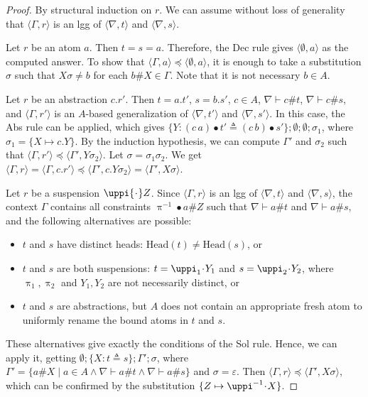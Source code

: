 \documentclass[11pt,a4paper]{amsart}
\theoremstyle{definition}
\newcommand{\head}{\mathrm{Head}}
\newcommand{\permap}{{\mkern 1mu\cdot \mkern 1mu}}
\newcommand{\permef}{\bullet}
\newcommand\ppi{\uppi}
\newcommand{\np}[2]{\langle #1, \allowbreak #2\rangle}
\newcommand{\Atoms}{A}
\begin{document}
\begin{proof}
 By structural induction on $r$. We can assume without loss of generality that $\np{\Gamma}{r}$ is an lgg of $\np{\nabla}{t}$ and $\np{\nabla}{s}$.

Let $r$ be an atom $a$. Then $t=s=a$. Therefore, the {\sf Dec} rule gives $\np{\emptyset}{a}$ as the computed answer. To show that $\np{\Gamma}{a}\preceq \np{\emptyset}{a}$, it is enough to take a substitution $\sigma$ such that $X\sigma \neq b$ for each $b\# X\in \Gamma$. Note that it is not necessary $b\in \Atoms$.

Let $r$ be an abstraction $c.r'$. Then $t=a.t'$, $s=b.s'$, $c\in A$, $\nabla\vdash c \# t$, $\nabla\vdash c \# s$, and $\np{\Gamma}{r'}$ is an $\Atoms$-based generalization of $\np{\nabla}{t'}$ and $\np{\nabla}{s'}$. In this case, the {\sf Abs} rule can be applied, which gives $\{Y:(c\,a)\permef t'\triangleq (c\,b)\permef s'\};\emptyset;\emptyset;\sigma_1$, where $\sigma_1=\{X\mapsto c.Y\}$. By the induction hypothesis, we can compute $\Gamma'$ and $\sigma_2$ such that $\np{\Gamma}{r'}\preceq \np{\Gamma'}{Y\sigma_2}$. Let $\sigma=\sigma_1\sigma_2$. We get $\np{\Gamma}{r}=\np{\Gamma}{c.r'} \preceq \np{\Gamma'}{c.Y\sigma_2}= \np{\Gamma'}{X\sigma}$.

Let $r$ be a suspension $\ppi\permap Z$. Since $\np{\Gamma}{r}$ is an lgg of $\np{\nabla}{t}$ and $\np{\nabla}{s}$, the context $\Gamma$ contains all constraints $\ppi^{-1}\permef a\# Z$ such that $\nabla\vdash a\# t$ and $\nabla\vdash a\# s$, and the following alternatives are possible:
\begin{itemize}
\item[(a)] $t$ and $s$ have distinct heads: ${ \head(t)}\neq { \head(s)}$, or
\item[(b)] $t$ and $s$ are both suspensions: $ t= \ppi_1 \permap Y_1$ and $ s=\ppi_2\permap Y_2$, where $\ppi_1,\ppi_2$ and $ Y_1,Y_2$ are not necessarily distinct, or
\item[(c)] $t$ and $s$ are abstractions, but $\Atoms$ does not contain an appropriate fresh atom to uniformly rename the bound atoms in $t$ and $s$.
\end{itemize}

These alternatives give exactly the conditions of the {\sf Sol} rule. Hence, we can apply it, getting $\emptyset;\{X:t\triangleq s\};\Gamma';\sigma$, where $\Gamma'=\{a\# X\mid a\in \Atoms\wedge \nabla \vdash a\# t \wedge \nabla\vdash a\# s\}$ and $\sigma=\varepsilon$. Then $\np{\Gamma}{r}\preceq \np{\Gamma'}{X\sigma}$, which can be confirmed by the substitution $\{Z\mapsto \ppi^{-1}\permap X\}$. 


\end{proof}
\end{document}
